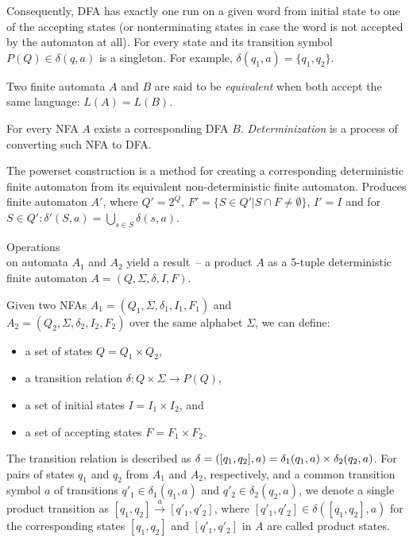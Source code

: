 Consequently, DFA has exactly one run on a given word from initial state to one of the accepting states (or nonterminating states in case the word is not accepted by the automaton at all). For every state and its transition symbol $P(Q) \in \delta(q, a)$ is a singleton. For example, $\delta(q_1, a) = \{ q_1, q_2 \}$.

Two finite automata $A$ and $B$ are said to be \emph{equivalent} when both accept the same language: $L(A) = L(B)$.

For every NFA $A$ exists a corresponding DFA $B$. \emph{Determinization} is a process of converting such NFA to DFA.

\begin{definition}
    The powerset construction is a method for creating a corresponding deterministic finite automaton from its equivalent non-deterministic finite automaton. Produces finite automaton $A'$, where $Q' = 2^Q$, $F' = \{S \in Q' | S \cap F \neq \emptyset\}$, $I' = I$ and for $S \in Q': \delta'(S, a) = \bigcup_{s \in S} \delta(s, a)$.
\end{definition}

\begin{definition}
Operations \\ on automata $A_1$ and $A_2$ yield a result~-- a product $A$ as a 5-tuple deterministic finite automaton $A = (Q, \Sigma, \delta, I, F)$.

Given two NFAs $A_1 = (Q_1, \Sigma, \delta_1, I_1, F_1)$ and \\ $A_2 = (Q_2, \Sigma, \delta_2, I_2, F_2)$ over the same alphabet $\Sigma$, we can define:
\begin{itemize}
    \item a set of states $Q = Q_1 \times Q_2$,
    \item a transition relation $\delta: Q \times \Sigma \rightarrow{} P(Q)$,
    \item a set of initial states $I = I_1 \times I_2$, and
    \item a set of accepting states $F = F_1 \times F_2$.
\end{itemize}
\end{definition}

The transition relation is described as $\delta = \\ ([q_1, q_2], a) = \delta_1(q_1, a) \times \delta_2(q_2, a)$. For pairs of states $q_1$ and $q_2$ from $A_1$ and $A_2$, respectively, and a common transition symbol $a$ of transitions $q'_1 \in \delta_1(q_1, a)$ and $q'_2 \in \delta_2(q_2,a)$, we denote a single product transition as $[q_1, q_2] \xrightarrow{a} [q'_1, q'_2]$, where $[q'_1, q'_2] \in \delta([q_1, q_2], a)$ for the corresponding states $[q_1, q_2]$ and $[q'_1, q'_2]$ in $A$ are called product states.

